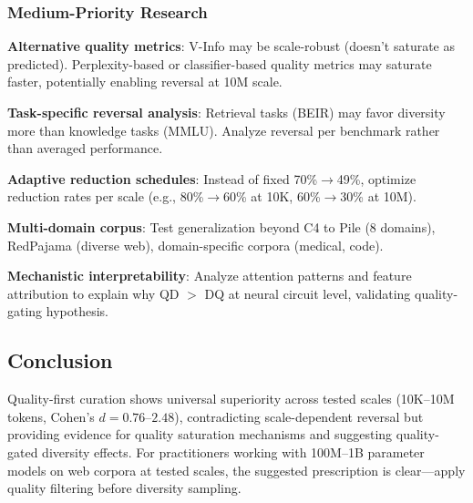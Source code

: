 \subsubsection{Medium-Priority Research}

\textbf{Alternative quality metrics}: V-Info may be scale-robust (doesn't saturate as predicted). Perplexity-based or classifier-based quality metrics may saturate faster, potentially enabling reversal at 10M scale.

\textbf{Task-specific reversal analysis}: Retrieval tasks (BEIR) may favor diversity more than knowledge tasks (MMLU). Analyze reversal per benchmark rather than averaged performance.

\textbf{Adaptive reduction schedules}: Instead of fixed 70\%$\rightarrow$49\%, optimize reduction rates per scale (e.g., 80\%$\rightarrow$60\% at 10K, 60\%$\rightarrow$30\% at 10M).

\textbf{Multi-domain corpus}: Test generalization beyond C4 to Pile (8 domains), RedPajama (diverse web), domain-specific corpora (medical, code).

\textbf{Mechanistic interpretability}: Analyze attention patterns and feature attribution to explain why QD $>$ DQ at neural circuit level, validating quality-gating hypothesis.

\subsection{Conclusion}

Quality-first curation shows universal superiority across tested scales (10K--10M tokens, Cohen's $d=0.76$--$2.48$), contradicting scale-dependent reversal but providing evidence for quality saturation mechanisms and suggesting quality-gated diversity effects. For practitioners working with 100M--1B parameter models on web corpora at tested scales, the suggested prescription is clear---apply quality filtering before diversity sampling.
